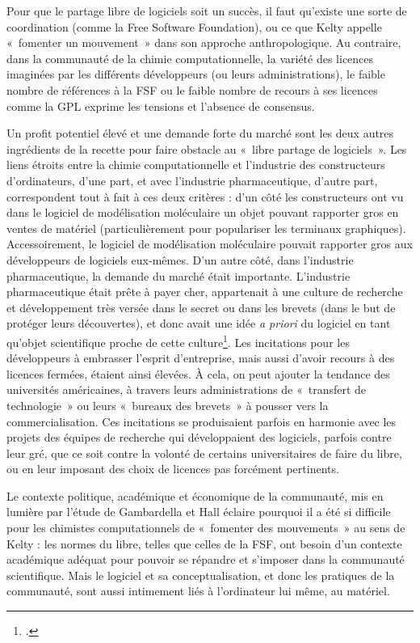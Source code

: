 \documentclass{FramateX}
\begin{document}
\begin{refsection}
Pour que le partage libre de logiciels soit un succès, il faut
qu'existe une sorte de coordination (comme la Free
Software Foundation), ou ce que Kelty appelle «~fomenter un mouvement~»
dans son approche anthropologique. Au contraire, dans la communauté de
la chimie computationnelle, la variété des licences imaginées par les
différents développeurs (ou leurs administrations), le faible nombre de
références à la FSF ou le faible nombre de recours à ses licences comme
la GPL exprime les tensions et l'absence de consensus.

Un profit potentiel élevé et une demande forte du marché sont les deux
autres ingrédients de la recette pour faire obstacle au «~libre partage
de logiciels~». Les liens étroits entre la chimie computationnelle et
l'industrie des constructeurs
d'ordinateurs, d'une part, et avec
l'industrie pharmaceutique, d'autre
part, correspondent tout à fait à ces deux critères :
d'un côté les constructeurs ont vu dans le logiciel de
modélisation moléculaire un objet pouvant rapporter gros en ventes de
matériel (particulièrement pour populariser les terminaux graphiques).
Accessoirement, le logiciel de modélisation moléculaire pouvait
rapporter gros aux développeurs de logiciels eux-mêmes.
D'un autre côté, dans l'industrie pharmaceutique, la
demande du marché était importante. L'industrie pharmaceutique était
prête à payer cher, appartenait à une culture de recherche et
développement très versée dans le secret ou dans les brevets (dans le
but de protéger leurs découvertes), et donc avait une idée \textit{a
priori} du logiciel en tant qu'objet scientifique
proche de cette culture\footnote{\cite{Mowery2001}.}. Les incitations pour les développeurs à
embrasser l'esprit d'entreprise, mais
aussi d'avoir recours à des licences fermées, étaient
ainsi élevées. À cela, on peut ajouter la tendance des universités
américaines, à travers leurs administrations de «~transfert de
technologie~» ou leurs «~bureaux des brevets~» à pousser vers la
commercialisation. Ces incitations se produisaient parfois en harmonie
avec les projets des équipes de recherche qui développaient des
logiciels, parfois contre leur gré, que ce soit contre la volonté de
certains universitaires de faire du libre, ou en leur imposant des
choix de licences pas forcément pertinents.

Le contexte politique, académique et économique de la communauté, mis en
lumière par l'étude de Gambardella et Hall éclaire
pourquoi il a été si difficile pour les chimistes computationnels de
«~fomenter des mouvements~» au sens de Kelty : les normes du libre,
telles que celles de la FSF, ont besoin d'un contexte
académique adéquat pour pouvoir se répandre et
s'imposer dans la communauté scientifique. Mais le
logiciel et sa conceptualisation, et donc les pratiques de la
communauté, sont aussi intimement liés à l'ordinateur
lui même, au matériel.


\end{refsection}
\end{document}
